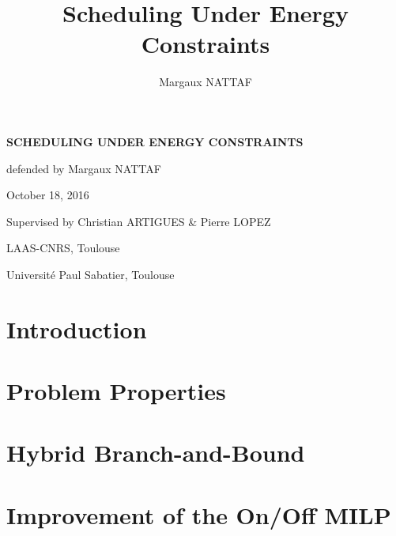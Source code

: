 \documentclass{beamer}
\title{Scheduling Under Energy Constraints}
\author{Margaux NATTAF}
\institute{LAAS-CNRS Toulouse

  Université Paul Sabatier Toulouse}
\begin{document}
{\canvasspecial
  \begin{frame}
    \vspace{1.5cm}
    \begin{flushleft}
      {\Large \bf \color{bleuLAAS}SCHEDULING UNDER ENERGY CONSTRAINTS}
      
      \vspace{0.3cm}
      \small \color{bleuLAAS!90} defended by Margaux NATTAF

      October 18, 2016
    \end{flushleft}
    \vspace{0.5cm}

    {\footnotesize  \color{bleuLAAS!80}
      Supervised by Christian ARTIGUES \& Pierre LOPEZ}

    \vspace{1.5cm}
    \begin{flushright} \color{bleuLAAS!70}
      \scriptsize LAAS-CNRS, Toulouse

      Université Paul Sabatier, Toulouse
    \end{flushright}
  \end{frame}}


 \tableofcontents
\setcounter{framenumber}{0}

\section{Introduction}



\section{Problem Properties}

\section{Hybrid Branch-and-Bound}


\section{Improvement of the On/Off MILP}

\end{document}
